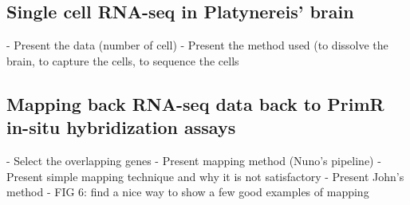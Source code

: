   \subsection*{Single cell RNA-seq in Platynereis' brain}
    - Present the data (number of cell)
    - Present the method used (to dissolve the brain, to capture the cells, to sequence the cells
  \subsection*{Mapping back RNA-seq data back to PrimR in-situ hybridization assays}
    - Select the overlapping genes
    - Present mapping method (Nuno's pipeline)
    - Present simple mapping technique and why it is not satisfactory
    - Present John's method  
    - FIG 6: find a nice way to show a few good examples of mapping

